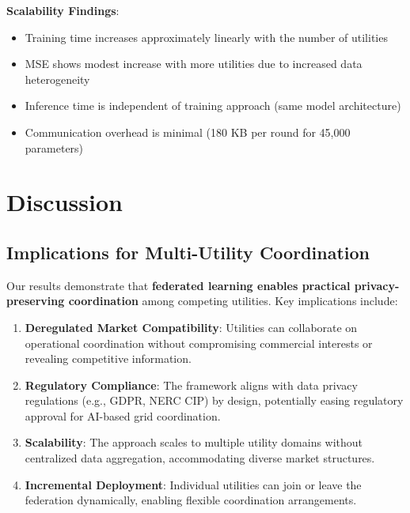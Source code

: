 \documentclass[journal,10pt]{IEEEtran}
\begin{document}
\textbf{Scalability Findings}:
\begin{itemize}
    \item Training time increases approximately linearly with the number of utilities
    \item MSE shows modest increase with more utilities due to increased data heterogeneity
    \item Inference time is independent of training approach (same model architecture)
    \item Communication overhead is minimal (180 KB per round for 45,000 parameters)
\end{itemize}

\section{Discussion}

\subsection{Implications for Multi-Utility Coordination}

Our results demonstrate that \textbf{federated learning enables practical privacy-preserving coordination} among competing utilities. Key implications include:

\begin{enumerate}
    \item \textbf{Deregulated Market Compatibility}: Utilities can collaborate on operational coordination without compromising commercial interests or revealing competitive information.
    
    \item \textbf{Regulatory Compliance}: The framework aligns with data privacy regulations (e.g., GDPR, NERC CIP) by design, potentially easing regulatory approval for AI-based grid coordination.
    
    \item \textbf{Scalability}: The approach scales to multiple utility domains without centralized data aggregation, accommodating diverse market structures.
    
    \item \textbf{Incremental Deployment}: Individual utilities can join or leave the federation dynamically, enabling flexible coordination arrangements.
\end{enumerate}
\end{document}
